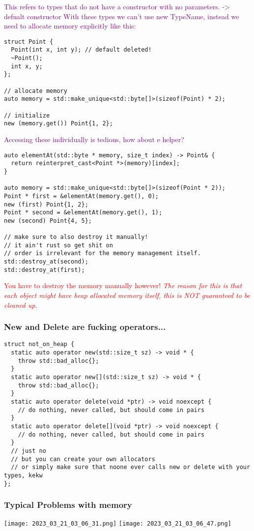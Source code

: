 \documentclass[main.tex,fontsize=8pt,paper=a4,paper=portrait,DIV=calc,]{scrartcl}
\begin{document}
\textcolor{purple}{This refers to types that do not have a constructor with no parameters. -> defualt constructor\newline
With these types we can't use new TypeName, instead we need to allocate memory explicitly like this:}
\begin{lstlisting}
struct Point {
  Point(int x, int y); // default deleted!
  ~Point();
  int x, y;
};

// allocate memory
auto memory = std::make_unique<std::byte[]>(sizeof(Point) * 2);

// initialize
new (memory.get()) Point{1, 2};
\end{lstlisting}
\textcolor{purple}{Accessing these individually is tedious, how about e helper?}
\begin{lstlisting}
auto elementAt(std::byte * memory, size_t index) -> Point& {
  return reinterpret_cast<Point *>(memory)[index];
}

auto memory = std::make_unique<std::byte[]>(sizeof(Point * 2));
Point * first = &elementAt(memory.get(), 0);
new (first) Point{1, 2};
Point * second = &elementAt(memory.get(), 1);
new (second) Point{4, 5};

// make sure to also destroy it manually!
// it ain't rust so get shit on
// order is irrelevant for the memory management itself.
std::destroy_at(second);
std::destroy_at(first);
\end{lstlisting}
\textcolor{red}{You have to destroy the memory manually however!\newline
\emph{The reason for this is that each object might have heap allocated memory itself, this is NOT guaranteed to be cleaned up.}}

\subsubsection{New and Delete are fucking operators...}
\begin{lstlisting}
struct not_on_heap {
  static auto operator new(std::size_t sz) -> void * {
    throw std::bad_alloc{};
  }
  static auto operator new[](std::size_t sz) -> void * {
    throw std::bad_alloc{};
  }
  static auto operator delete(void *ptr) -> void noexcept {
    // do nothing, never called, but should come in pairs
  }
  static auto operator delete[](void *ptr) -> void noexcept {
    // do nothing, never called, but should come in pairs
  }
  // just no
  // but you can create your own allocators
  // or simply make sure that noone ever calls new or delete with your types, kekw
};
\end{lstlisting}

\subsubsection{Typical Problems with memory}
\texttt{[image: 2023\_03\_21\_03\_06\_31.png]}\newline
\texttt{[image: 2023\_03\_21\_03\_06\_47.png]}
\end{document}

